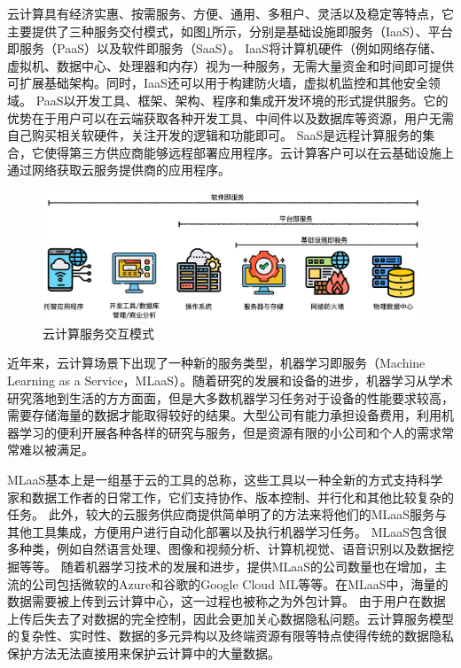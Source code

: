 云计算具有经济实惠、按需服务、方便、通用、多租户、灵活以及稳定等特点，它主要提供了三种服务交付模式，如图\ref{img_saas}所示，分别是基础设施即服务（IaaS）、平台即服务（PaaS）以及软件即服务（SaaS）。
IaaS将计算机硬件（例如网络存储、虚拟机、数据中心、处理器和内存）视为一种服务，无需大量资金和时间即可提供可扩展基础架构。同时，IaaS还可以用于构建防火墙，虚拟机监控和其他安全领域\cite{manvi2014resource}。
PaaS以开发工具、框架、架构、程序和集成开发环境的形式提供服务。它的优势在于用户可以在云端获取各种开发工具、中间件以及数据库等资源，用户无需自己购买相关软硬件，关注开发的逻辑和功能即可。
SaaS是远程计算服务的集合，它使得第三方供应商能够远程部署应用程序。云计算客户可以在云基础设施上通过网络获取云服务提供商的应用程序\cite{antonopoulos2010cloud}。

\begin{figure}[htbp]
	\centering
	\includegraphics[width=1.0\linewidth]{img/cloudservice.png}
	\caption{云计算服务交互模式}
	\label{img_saas}
\end{figure}

近年来，云计算场景下出现了一种新的服务类型，机器学习即服务（Machine Learning as a Service，MLaaS）\cite{ribeiro2015mlaas}。随着研究的发展和设备的进步，机器学习从学术研究落地到生活的方方面面，但是大多数机器学习任务对于设备的性能要求较高，需要存储海量的数据才能取得较好的结果。大型公司有能力承担设备费用，利用机器学习的便利开展各种各样的研究与服务，但是资源有限的小公司和个人的需求常常难以被满足。

MLaaS基本上是一组基于云的工具的总称，这些工具以一种全新的方式支持科学家和数据工作者的日常工作，它们支持协作、版本控制、并行化和其他比较复杂的任务。
此外，较大的云服务供应商提供简单明了的方法来将他们的MLaaS服务与其他工具集成，方便用户进行自动化部署以及执行机器学习任务。
MLaaS包含很多种类，例如自然语言处理、图像和视频分析、计算机视觉、语音识别以及数据挖掘等等。
随着机器学习技术的发展和进步，提供MLaaS的公司数量也在增加，主流的公司包括微软的Azure和谷歌的Google Cloud ML等等。在MLaaS中，海量的数据需要被上传到云计算中心，这一过程也被称之为外包计算。
由于用户在数据上传后失去了对数据的完全控制，因此会更加关心数据隐私问题。云计算服务模型的复杂性、实时性、数据的多元异构以及终端资源有限等特点使得传统的数据隐私保护方法无法直接用来保护云计算中的大量数据\cite{hunt2018chiron}。

